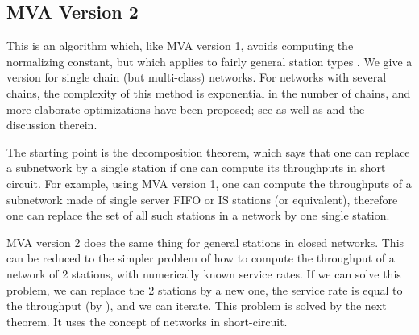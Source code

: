 %
%
%
%
\subsection{MVA Version 2}
\label{sec-mva-2} This is an algorithm which,
like MVA version 1, avoids computing the
normalizing constant, but which applies to fairly
general station types \cite{reiser1981mean}. We
give a version for single chain (but multi-class)
networks. For networks with several chains, the
complexity of this method is exponential in the
number of chains, and more elaborate
optimizations have been proposed; see
\cite{conway1986recal,conway1989mean} as well as
\cite{balsamo2000product} and the discussion
therein.

The starting point is the decomposition theorem,
which says that one can replace a subnetwork by a
single station if one can compute its throughputs
in short circuit. For example, using MVA version
1, one can compute the throughputs of a
subnetwork made of single server FIFO or IS
stations (or equivalent), therefore one can replace
the set of all such stations in a network by one
single station.

MVA version 2 does the same thing for general
stations in closed networks. This can be reduced
to the simpler problem of how to compute the
throughput of a network of 2 stations, with
numerically known service rates. If we can solve
this problem, we can replace the 2 stations by a
new one, the service rate is equal to the
throughput (by ), and
we can iterate. This problem is solved by the
next theorem. It uses the concept of networks in
short-circuit.

